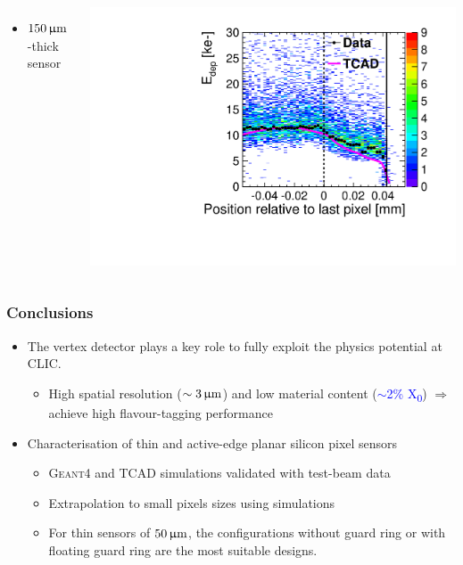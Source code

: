 \begin{frame}
\begin{columns}
    \begin{itemize}
    \item $150\,\upmu\mathrm{m}$-thick sensor
    \end{itemize}
    \centering
    \includegraphics[width=\textwidth]{../figures/ActiveEdge/55_GNDGR_150_Edep_TCAD_data.pdf}
  \end{columns}

\end{frame}

\label{lastslide}
\begin{frame}
  \frametitle{Conclusions}

  \begin{itemize}
  \item The vertex detector plays a key role to fully exploit the
    physics potential at CLIC.
    \begin{itemize}
    \item High spatial resolution (\textcolor{Blue}{$\sim3\,\upmu\mathrm{m}$})
      and low material content (\textcolor{Blue}{$\sim$2\%
        X\textsubscript{0}}) $\Rightarrow$ achieve high
      flavour-tagging performance
    \end{itemize} 
    \item Characterisation of thin and active-edge planar silicon
      pixel sensors
      \begin{itemize}
      \item \textsc{Geant4} and TCAD simulations validated with
        test-beam data
      \item Extrapolation to small pixels sizes using simulations
      \item For thin sensors of $50\,\upmu\mathrm{m}$, the configurations
        without guard ring or with floating guard ring are the most
        suitable designs.
      \end{itemize}

  \end{itemize}

\end{frame}

